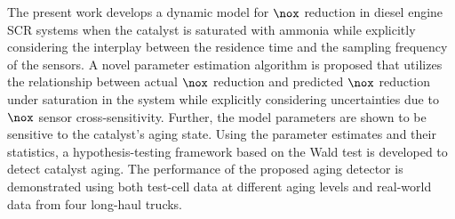 The present work develops a dynamic model for $\nox$ reduction in diesel engine SCR systems when the catalyst is
saturated with ammonia while explicitly considering the interplay between the residence time and the sampling frequency
of the sensors. A novel parameter estimation algorithm is proposed that utilizes the relationship between actual $\nox$
reduction and predicted $\nox$ reduction under saturation in the system while explicitly considering uncertainties due
to $\nox$ sensor cross-sensitivity. Further, the model parameters are shown to be sensitive to the
catalyst's aging state. Using the parameter estimates and their statistics, a hypothesis-testing framework based on the
Wald test is developed to detect catalyst aging. The performance of the proposed aging detector is demonstrated using
both test-cell data at different aging levels and real-world data from four long-haul trucks.
